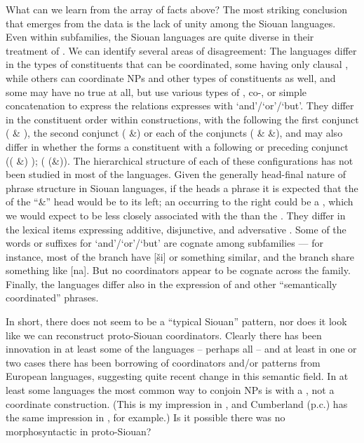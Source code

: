 \documentclass[output=paper]{LSP/langsci}
\begin{document}
What can we learn from the array of facts above? The most striking conclusion that emerges from the data is the lack of unity among the Siouan languages. Even within subfamilies, the Siouan languages are quite diverse in their treatment of . We can identify several areas of disagreement:  The languages differ in the types of constituents that can be coordinated, some having only clausal , while others can coordinate NPs and other types of constituents as well, and some may have no true
 at all, but use various types of , co-, or simple concatenation to express the relations  expresses with `and'/`or'/`but'.  They differ in the constituent order within  constructions, with the  following the first conjunct ( \& ), the second conjunct (  \&) or each of the conjuncts ( \&  \&), and may also differ in whether the  forms a constituent with a following or preceding conjunct (( \&) ); ( (\&)). The hierarchical structure of each of these configurations has not been studied in most of the languages. Given the generally head-final nature of phrase structure in Siouan languages, if the  heads a  phrase it is expected that the  of the ``\&'' head would be to its left; an  occurring to the right could be a , which we would expect to be less closely associated with the  than the .  They differ in the lexical items expressing additive, disjunctive, and adversative . Some of the words or suffixes for `and'/`or'/`but' are cognate among subfamilies --- for instance, most of the  branch have [\v{s}i] or something similar, and the  branch share something like [na]. But no coordinators appear to be cognate across the family.  Finally, the languages differ also in the expression of  and other ``semantically coordinated'' phrases.

In short, there does not seem to be a ``typical Siouan''  pattern, nor does it look like we can reconstruct proto-Siouan coordinators. Clearly there has been innovation in at least some of the languages -- perhaps all -- and at least in one or two cases there has been borrowing of coordinators and/or  patterns from European languages, suggesting quite recent change in this semantic field. In at least some languages the most common way to conjoin NPs is with a , not a coordinate construction. (This is my impression in , and Cumberland (p.c.) has the same impression in , for example.) Is it possible there was no morphosyntactic  in proto-Siouan?
\end{document}
